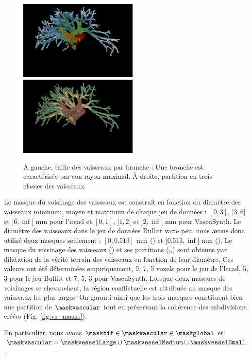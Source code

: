 \begin{figure}[h]
  \centering
  \includegraphics[height=4cm]{Images/vs_labels.png}
  \includegraphics[height=4cm]{Images/vs_labelMask.png}
  \caption{À gauche, taille des vaisseaux par branche : Une branche est caractérisée par son rayon maximal. À droite, partition en trois classes des vaisseaux }
  \label{fig:vessels_partition}
\end{figure}

Le masque du voisinage des vaisseaux est construit en fonction du diamètre des vaisseaux minimum, moyen et maximum de chaque jeu de données : $[0,3]$, $]3,6[$ et $]6,\inf[$ mm pour l'ircad et $[0,1]$, $]1,2[$ et $]2,\inf[$ mm pour VascuSynth. Le diamètre des vaisseaux dans le jeu de données Bullitt varie peu, nous avons donc utilisé deux masques seulement : $[0,0.513]$ mm (\maskvesselSmall) et $]0.513,\inf[$ mm (\maskvesselMedium). Le masque du voisinage des vaisseaux (\maskvessel) et ses partitions (\maskvesselLarge,\maskvesselMedium,\maskvesselSmall) sont obtenus par dilatation de la vérité terrain des vaisseaux en fonction de leur diamètre. Ces valeurs ont été déterminées empiriquement, 9, 7, 5 voxels pour le jeu de l'Ircad, 5, 3 pour le jeu Bullitt et 7, 5, 3 pour VascuSynth. Lorsque deux masques de voisinages se chevauchent, la région conflictuelle est attribuée au masque des vaisseaux les plus larges. On garanti ainsi que les trois masques constituent bien une partition de $\maskvascular$ tout en préservant la cohérence des subdivisions créées (Fig. \ref{fig:vs_masks}).

En particulier, nous avons $\maskbif \in \maskvascular \in \maskglobal$ et $\maskvascular = \maskvesselLarge \cup \maskvesselMedium \cup \maskvesselSmall$.

